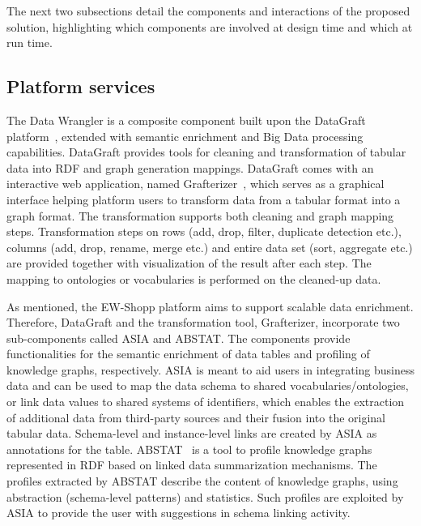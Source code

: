 The next two subsections detail the components and interactions of the proposed solution, highlighting which components are involved at design time and which at run time. 


\subsection{Platform services}

The Data Wrangler is a composite component built upon the DataGraft platform~\cite{roman2016datagraft}, extended with semantic enrichment and Big Data processing capabilities. DataGraft provides tools for cleaning and transformation of tabular data into RDF and graph generation mappings.
DataGraft comes with an interactive web application, named Grafterizer~\cite{sukhobok2016tabular}, which serves as a graphical interface helping platform users to transform data from a tabular format into a graph format. The transformation supports both cleaning and graph mapping steps. Transformation steps on rows (add, drop, filter, duplicate detection etc.), columns (add, drop, rename, merge etc.) and entire data set (sort, aggregate etc.) are provided together with visualization of the result after each step. The mapping to ontologies or vocabularies is performed on the cleaned-up data. 

As mentioned, the EW-Shopp platform aims to support scalable data enrichment. Therefore, DataGraft and the transformation tool, Grafterizer, incorporate two sub-components called ASIA and ABSTAT. The components provide functionalities for the semantic enrichment of data tables and profiling of knowledge graphs, respectively. ASIA is meant to aid users in integrating business data and can be used to map the data schema to shared vocabularies/ontologies, or link data values to shared systems of identifiers, which enables the extraction of additional data from third-party sources and their fusion into the original tabular data. Schema-level and instance-level links are created by ASIA as annotations for the table. ABSTAT~\cite{palmonari2015abstat} is a tool to profile knowledge graphs represented in RDF based on linked data summarization mechanisms. The profiles extracted by ABSTAT describe the content of knowledge graphs, using abstraction (schema-level patterns) and statistics. Such profiles are exploited by ASIA to provide the user with suggestions in schema linking activity. 

 